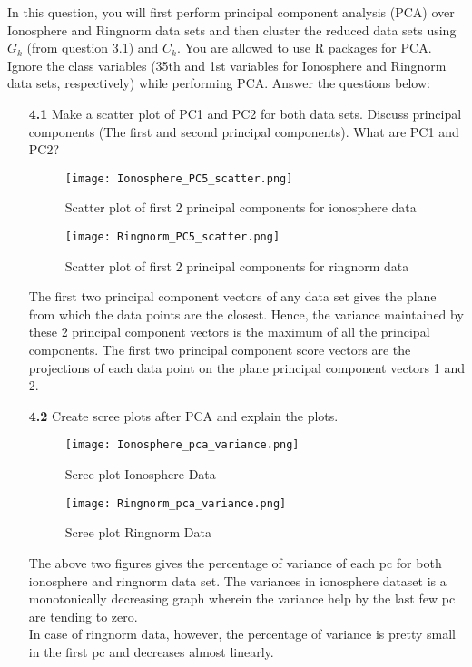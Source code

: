 \documentclass{article}
\begin{document}
In this question, you will first perform principal component analysis (PCA) over Ionosphere and Ringnorm data sets and then cluster the  reduced data sets using $G_k$ (from question 3.1) and $C_k$. You are allowed to use R packages for PCA.
Ignore the class variables (35th and 1st variables for Ionosphere  and Ringnorm data sets, respectively) while performing PCA. Answer the questions below:
 \\
  \begin{enumerate}
  \item[\textbf{4.1}]  Make a scatter plot of PC1 and PC2  for both data sets. Discuss principal
components (The first and  second principal components). What are PC1 and PC2?
\\
\begin{figure}[H]
      \texttt{[image: Ionosphere\_PC5\_scatter.png]}
      \caption{Scatter plot of first 2 principal components for ionosphere data}
  	\end{figure}
    
    \begin{figure}[H]
      \texttt{[image: Ringnorm\_PC5\_scatter.png]}
      \caption{Scatter plot of first 2 principal components for ringnorm data}
  	\end{figure}

The first two principal component vectors of any data set gives the plane from which the data points are the closest. Hence, the variance maintained by these 2 principal component vectors is the maximum of all the principal components.
The first two principal component score vectors are the projections of each data point on the plane principal component vectors 1 and 2.

  \item[\textbf{4.2}]  Create scree plots after PCA and explain the plots.
\\
	\begin{figure}[H]
      \texttt{[image: Ionosphere\_pca\_variance.png]}
      \caption{Scree plot Ionosphere Data}
  	\end{figure}
    
    \begin{figure}[H]
      \texttt{[image: Ringnorm\_pca\_variance.png]}
      \caption{Scree plot Ringnorm Data}
  	\end{figure}
    
The above two figures gives the percentage of variance of each pc for both ionosphere and ringnorm data set. The variances in ionosphere dataset is a monotonically decreasing graph wherein the variance help by the last few pc are tending to zero.\\
In case of ringnorm data, however, the percentage of variance is pretty small in the first pc and decreases almost linearly. 


\end{enumerate}
\end{document}
